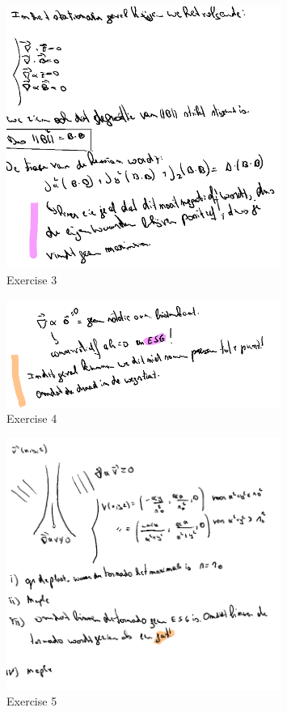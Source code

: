 \documentclass[a4paper]{article}
\begin{document}
\begin{figure}[H]
	\centering
	\includegraphics[width=0.8\textwidth]{assets/huis_6_ex_3.png}
	\caption{Exercise 3}
	\label{fig:huis_6_ex_3}
\end{figure}


\begin{figure}[H]
	\centering
	\includegraphics[width=0.8\textwidth]{assets/huis_6_ex_4.png}
	\caption{Exercise 4}
	\label{fig:huis_6_ex_4}
\end{figure}


\begin{figure}[H]
	\centering
	\includegraphics[width=0.8\textwidth]{assets/huis_6_ex_5.png}
	\caption{Exercise 5}
	\label{fig:huis_6_ex_5}
\end{figure}
\end{document}
